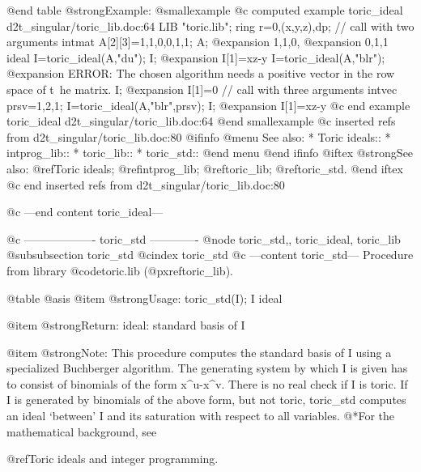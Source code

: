 @end table
@strong{Example:}
@smallexample
@c computed example toric_ideal d2t_singular/toric_lib.doc:64 
LIB "toric.lib";
ring r=0,(x,y,z),dp;
// call with two arguments
intmat A[2][3]=1,1,0,0,1,1;
A;
@expansion{} 1,1,0,
@expansion{} 0,1,1 
ideal I=toric_ideal(A,"du");
I;
@expansion{} I[1]=xz-y
I=toric_ideal(A,"blr");
@expansion{} ERROR: The chosen algorithm needs a positive vector in the row space of t\
   he matrix.
I;
@expansion{} I[1]=0
// call with three arguments
intvec prsv=1,2,1;
I=toric_ideal(A,"blr",prsv);
I;
@expansion{} I[1]=xz-y
@c end example toric_ideal d2t_singular/toric_lib.doc:64
@end smallexample
@c inserted refs from d2t_singular/toric_lib.doc:80
@ifinfo
@menu
See also:
* Toric ideals::
* intprog_lib::
* toric_lib::
* toric_std::
@end menu
@end ifinfo
@iftex
@strong{See also:}
@ref{Toric ideals};
@ref{intprog_lib};
@ref{toric_lib};
@ref{toric_std}.
@end iftex
@c end inserted refs from d2t_singular/toric_lib.doc:80

@c ---end content toric_ideal---

@c ------------------- toric_std -------------
@node toric_std,, toric_ideal, toric_lib
@subsubsection toric_std
@cindex toric_std
@c ---content toric_std---
Procedure from library @code{toric.lib} (@pxref{toric_lib}).

@table @asis
@item @strong{Usage:}
toric_std(I); I ideal

@item @strong{Return:}
ideal: standard basis of I

@item @strong{Note:}
This procedure computes the standard basis of I using a specialized
Buchberger algorithm. The generating system by which I is given has
to consist of binomials of the form x^u-x^v. There is no real check
if I is toric. If I is generated by binomials of the above form,
but not toric, toric_std computes an ideal `between' I and its
saturation with respect to all variables.
@*For the mathematical background, see

   @ref{Toric ideals and integer programming}.


